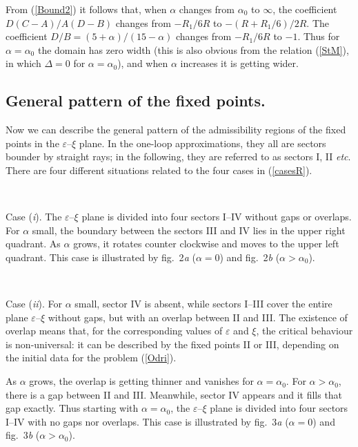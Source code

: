 \documentclass[12pt]{iopart}
\begin{document}
From (\ref{Bound2}) it follows that, when $\alpha$ changes from $\alpha_{0}$
to $\infty$, the coefficient $D(C-A)/A(D-B)$ changes from $-R_{1}/6R$ to
$-(R+R_{1}/6)/2R$. The coefficient $D/B= (5+\alpha)/(15-\alpha)$ changes
from $-R_{1}/6R$ to $-1$. Thus for $\alpha=\alpha_{0}$ the domain has zero
width (this is also obvious from the relation (\ref{StM}), in which
$\Delta=0$ for $\alpha=\alpha_{0}$), and when $\alpha$ increases
it is getting wider.


\subsection{General pattern of the fixed points.} \label{gpf}

Now we can describe the general pattern of the admissibility regions of the
fixed points in the $\varepsilon$--$\xi$ plane. In the one-loop
approximations, they all are sectors bounder by straight rays; in the
following, they are referred to as sectors I, II {\it etc}. There are
four different situations related to the four cases in (\ref{casesR}).

\

Case ({\it i}). The $\varepsilon$--$\xi$ plane is divided into four
sectors I--IV
without gaps or overlaps. For $\alpha$ small, the boundary between the
sectors III and IV lies in the upper right quadrant. As $\alpha$ grows, it
rotates counter clockwise and moves to the upper left quadrant. This case
is illustrated by fig.~2{\it a} ($\alpha=0$) and fig.~2{\it b}
($\alpha>\alpha_{0}$).

\

Case ({\it ii}). For $\alpha$ small, sector IV is absent, while
sectors I--III cover the entire plane $\varepsilon$--$\xi$ without
gaps, but with an overlap between II and III. The existence of overlap
means that, for the corresponding values of $\varepsilon$ and $\xi$,
the critical behaviour is non-universal: it can be described by the fixed
points II or III, depending on the initial data for the problem
(\ref{Odri}).

As $\alpha$ grows, the overlap is getting thinner and vanishes for
$\alpha=\alpha_{0}$. For $\alpha>\alpha_{0}$, there is a gap between
II and III. Meanwhile, sector IV appears and it fills that gap exactly.
Thus starting with $\alpha=\alpha_{0}$, the $\varepsilon$--$\xi$ plane
is divided into four sectors I--IV with no gaps nor overlaps. This case
is illustrated by fig.~3{\it a} ($\alpha=0$) and fig.~3{\it b}
($\alpha>\alpha_{0}$).
\end{document}
